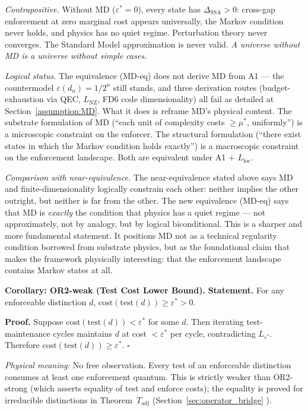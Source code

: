 \documentclass[11pt]{article}
\theoremstyle{remark}
\begin{document}
\smallskip\noindent\textit{Contrapositive.}  Without MD ($\varepsilon^* = 0$),
every state has $\Delta_{\mathrm{SSA}} > 0$: cross-gap enforcement at zero
marginal cost appears universally, the Markov condition never holds, and physics has
no quiet regime.  Perturbation theory never converges.  The Standard Model
approximation is never valid.  \emph{A universe without MD is a universe without
simple cases.}

\smallskip\noindent\textit{Logical status.}  The equivalence (MD-eq) does not
derive MD from A1 --- the countermodel $\varepsilon(d_n) = 1/2^n$ still stands,
and three derivation routes (budget-exhaustion via QEC, $L_{\mathrm{NZ}}$, FD6
code dimensionality) all fail as detailed at Section~\ref{assumption:MD}.  What it
does is reframe MD's physical content.  The substrate formulation of MD
(``each unit of complexity costs $\ge \mu^*$, uniformly'') is a microscopic
constraint on the enforcer.  The structural formulation (``there exist states in
which the Markov condition holds exactly'') is a macroscopic constraint on the
enforcement landscape.  Both are equivalent under A1 $+$ $L_{\mathrm{loc}}$.

\smallskip\noindent\textit{Comparison with near-equivalence.}  The
near-equivalence stated above says MD and finite-dimensionality logically
constrain each other: neither implies the other outright, but neither is far from
the other.  The new equivalence (MD-eq) says that MD is \emph{exactly} the
condition that physics has a quiet regime --- not approximately, not by analogy, but
by logical biconditional.  This is a sharper and more fundamental statement.  It
positions MD not as a technical regularity condition borrowed from substrate
physics, but as the foundational claim that makes the framework physically
interesting: that the enforcement landscape contains Markov states at all.

\medskip\noindent\textbf{Corollary: OR2-weak (Test Cost Lower Bound).}
\textbf{Statement.}
For any enforceable distinction $d$, $\mathrm{cost}(\mathrm{test}(d)) \ge \varepsilon^* > 0$.

\smallskip\noindent\textbf{Proof.}
Suppose $\mathrm{cost}(\mathrm{test}(d)) < \varepsilon^*$ for some $d$.  Then iterating test-maintenance cycles maintains $d$ at cost $< \varepsilon^*$ per cycle, contradicting $L_{\varepsilon^*}$.  Therefore $\mathrm{cost}(\mathrm{test}(d)) \ge \varepsilon^*$.  \hfill$\square$

\smallskip\noindent\textit{Physical meaning:} No free observation.  Every test of an enforceable distinction consumes at least one enforcement quantum.  This is strictly weaker than OR2-strong (which asserts equality of test and enforce costs); the equality is proved for irreducible distinctions in Theorem~$T_{\mathrm{adj}}$ (Section~\ref{sec:operator_bridge} ).
\end{document}
